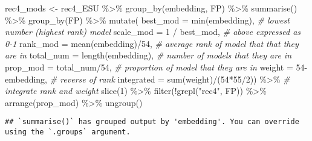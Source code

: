 \documentclass[
]{article}
\newenvironment{Shaded}{\begin{snugshade}}{\end{snugshade}}
\newcommand{\AttributeTok}[1]{\textcolor[rgb]{0.77,0.63,0.00}{#1}}
\newcommand{\CommentTok}[1]{\textcolor[rgb]{0.56,0.35,0.01}{\textit{#1}}}
\newcommand{\DecValTok}[1]{\textcolor[rgb]{0.00,0.00,0.81}{#1}}
\newcommand{\FunctionTok}[1]{\textcolor[rgb]{0.00,0.00,0.00}{#1}}
\newcommand{\NormalTok}[1]{#1}
\newcommand{\OtherTok}[1]{\textcolor[rgb]{0.56,0.35,0.01}{#1}}
\newcommand{\SpecialCharTok}[1]{\textcolor[rgb]{0.00,0.00,0.00}{#1}}
\newcommand{\StringTok}[1]{\textcolor[rgb]{0.31,0.60,0.02}{#1}}
\begin{document}
\begin{Shaded}
\begin{Highlighting}[]
\NormalTok{rec4\_mods }\OtherTok{\textless{}{-}}\NormalTok{ rec4\_ESU }\SpecialCharTok{\%\textgreater{}\%}
  \FunctionTok{group\_by}\NormalTok{(embedding, FP) }\SpecialCharTok{\%\textgreater{}\%} 
  \FunctionTok{summarise}\NormalTok{() }\SpecialCharTok{\%\textgreater{}\%} 
  \FunctionTok{group\_by}\NormalTok{(FP) }\SpecialCharTok{\%\textgreater{}\%} 
  \FunctionTok{mutate}\NormalTok{(}
    \AttributeTok{best\_mod =} \FunctionTok{min}\NormalTok{(embedding), }\CommentTok{\# lowest number (highest rank) model}
    \AttributeTok{scale\_mod =} \DecValTok{1} \SpecialCharTok{/}\NormalTok{ best\_mod, }\CommentTok{\# above expressed as 0{-}1}
    \AttributeTok{rank\_mod =} \FunctionTok{mean}\NormalTok{(embedding)}\SpecialCharTok{/}\DecValTok{54}\NormalTok{, }\CommentTok{\# average rank of model that that they are in}
    \AttributeTok{total\_num =} \FunctionTok{length}\NormalTok{(embedding), }\CommentTok{\# number of models that they are in}
    \AttributeTok{prop\_mod =}\NormalTok{ total\_num}\SpecialCharTok{/}\DecValTok{54}\NormalTok{, }\CommentTok{\# proportion of model that they are in }
    \AttributeTok{weight =} \DecValTok{54}\SpecialCharTok{{-}}\NormalTok{embedding, }\CommentTok{\# reverse of rank}
    \AttributeTok{integrated =} \FunctionTok{sum}\NormalTok{(weight)}\SpecialCharTok{/}\NormalTok{(}\DecValTok{54}\SpecialCharTok{*}\DecValTok{55}\SpecialCharTok{/}\DecValTok{2}\NormalTok{)) }\SpecialCharTok{\%\textgreater{}\%} \CommentTok{\# integrate rank and weight }
  \FunctionTok{slice}\NormalTok{(}\DecValTok{1}\NormalTok{) }\SpecialCharTok{\%\textgreater{}\%} 
  \FunctionTok{filter}\NormalTok{(}\SpecialCharTok{!}\FunctionTok{grepl}\NormalTok{(}\StringTok{"rec4"}\NormalTok{, FP)) }\SpecialCharTok{\%\textgreater{}\%} 
  \FunctionTok{arrange}\NormalTok{(prop\_mod) }\SpecialCharTok{\%\textgreater{}\%} 
  \FunctionTok{ungroup}\NormalTok{()}
\end{Highlighting}
\end{Shaded}

\begin{verbatim}
## `summarise()` has grouped output by 'embedding'. You can override using the `.groups` argument.
\end{verbatim}

\begin{Shaded}
\end{Shaded}
\end{document}
